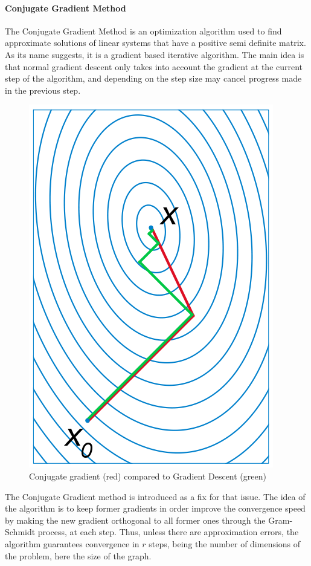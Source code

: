 \documentclass{article}
\theoremstyle{definition}
\begin{document}
\paragraph{Conjugate Gradient Method}
The Conjugate Gradient Method\cite{nesterov_lectures_2018} is an optimization algorithm used to find approximate solutions of linear systems that have a positive semi definite matrix. As its name suggests, it is a gradient based iterative algorithm. The main idea is that normal gradient descent only takes into account the gradient at the current step of the algorithm, and depending on the step size may cancel progress made in the previous step.
\begin{figure}[!htb]
	\centering
	\includegraphics[height=0.3\textheight]{data/sota/conj_grad.png}
	\caption{Conjugate gradient (red) compared to Gradient Descent (green)}
	\label{fig:conj_grad}
\end{figure} 
The Conjugate Gradient method is introduced as a fix for that issue. The idea of the algorithm is to keep former gradients in order improve the convergence speed by making the new gradient orthogonal to all former ones through the Gram-Schmidt process, at each step. Thus, unless there are approximation errors, the algorithm guarantees convergence in $r$ steps, being the number of dimensions of the problem, here the size of the graph.\\
\end{document}
